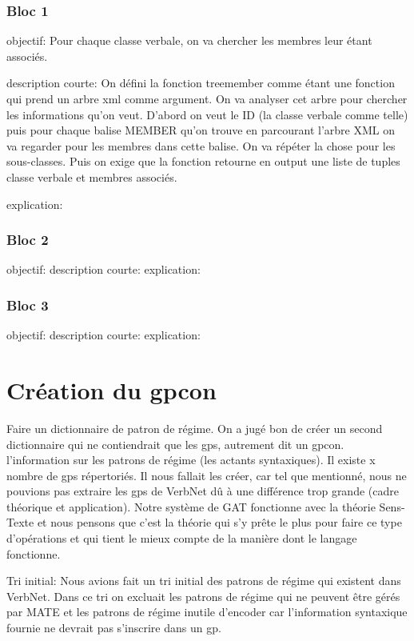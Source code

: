 \subsubsection{Bloc 1}
objectif: Pour chaque classe verbale, on va chercher les membres leur étant associés.

description courte: On défini la fonction treemember comme étant une fonction qui prend un arbre xml comme argument. On va analyser cet arbre pour chercher les informations qu'on veut. D'abord on veut le ID (la classe verbale comme telle) puis pour chaque balise MEMBER qu'on trouve en parcourant l'arbre XML on va regarder pour les membres dans cette balise. On va répéter la chose pour les sous-classes. Puis on exige que la fonction retourne en output une liste de tuples classe verbale et membres associés.

explication:

\subsubsection{Bloc 2}
objectif:
description courte:
explication:

\subsubsection{Bloc 3}
objectif:
description courte:
explication:

\section{Création du gpcon}
Faire un dictionnaire de patron de régime. On a jugé bon de créer un second dictionnaire qui ne contiendrait que les gps, autrement dit un gpcon. l'information sur les patrons de régime (les actants syntaxiques). Il existe x nombre de gps répertoriés. Il nous fallait les créer, car tel que mentionné, nous ne pouvions pas extraire les gps de VerbNet dû à une différence trop grande (cadre théorique et application). Notre système de GAT fonctionne avec la théorie Sens-Texte et nous pensons que c'est la théorie qui s'y prête le plus pour faire ce type d'opérations et qui tient le mieux compte de la manière dont le langage fonctionne.

Tri initial: Nous avions fait un tri initial des patrons de régime qui existent dans VerbNet. Dans ce tri on excluait les patrons de régime qui ne peuvent être gérés par MATE et les patrons de régime inutile d'encoder car l'information syntaxique fournie ne devrait pas s'inscrire dans un gp.

